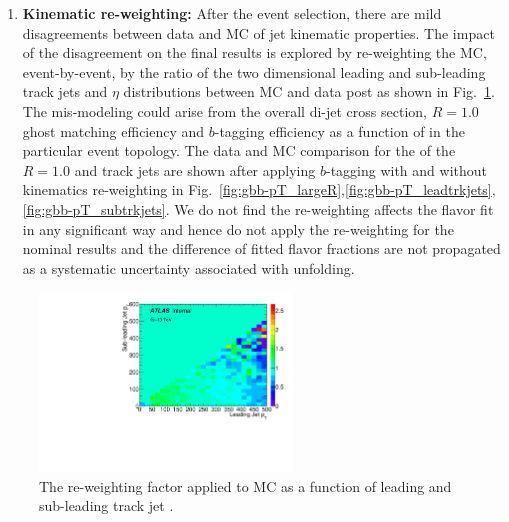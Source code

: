 \begin{enumerate}
  \item \textbf{Kinematic re-weighting:} After the event selection, there are mild disagreements between data and MC of jet kinematic properties. The impact of the disagreement on the final results is explored by re-weighting the MC, event-by-event, by the ratio of the two dimensional leading and sub-leading track jets \pt and $\eta$ distributions between MC and data post \btagging as shown in Fig.~\ref{fig:gbb-reweightmap}. The mis-modeling could arise from the overall di-jet cross section, $R=1.0$ ghost matching efficiency and $b$-tagging efficiency as a function of \pt in the particular event topology. The data and MC comparison for the \pt of the $R=1.0$ and track jets are shown after applying $b$-tagging with and without kinematics re-weighting in Fig.~\ref{fig:gbb-pT_largeR},\ref{fig:gbb-pT_leadtrkjets},\ref{fig:gbb-pT_subtrkjets}. We do not find the re-weighting affects the flavor fit in any significant way and hence do not apply the re-weighting for the nominal results and the difference of fitted flavor fractions are not propagated as a systematic uncertainty associated with unfolding.


\end{enumerate}

\begin{figure}[htbp]
  \centering
 \includegraphics[width=0.6\textwidth]{figures/gbb/pTReweightMap.pdf}
\caption{The re-weighting factor applied to MC as a function of leading and sub-leading track jet \pt.}
  \label{fig:gbb-reweightmap}
\end{figure}


